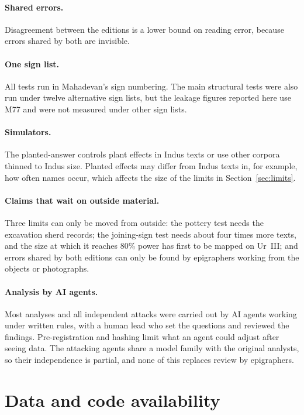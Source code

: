 \documentclass[11pt,a4paper]{article}
\begin{document}
\paragraph{Shared errors.} Disagreement between the editions is a lower bound on reading error, because errors shared by both are invisible.

\paragraph{One sign list.} All tests run in Mahadevan's sign numbering. The main structural tests were also run under twelve alternative sign lists, but the leakage figures reported here use M77 and were not measured under other sign lists.

\paragraph{Simulators.} The planted-answer controls plant effects in Indus texts or use other corpora thinned to Indus size. Planted effects may differ from Indus texts in, for example, how often names occur, which affects the size of the limits in Section~\ref{sec:limits}.

\paragraph{Claims that wait on outside material.} Three limits can only be moved from outside: the pottery test needs the excavation sherd records; the joining-sign test needs about four times more texts, and the size at which it reaches 80\% power has first to be mapped on Ur~III; and errors shared by both editions can only be found by epigraphers working from the objects or photographs.

\paragraph{Analysis by AI agents.} Most analyses and all independent attacks were carried out by AI agents working under written rules, with a human lead who set the questions and reviewed the findings. Pre-registration and hashing limit what an agent could adjust after seeing data. The attacking agents share a model family with the original analysts, so their independence is partial, and none of this replaces review by epigraphers.

\section*{Data and code availability}
\end{document}
